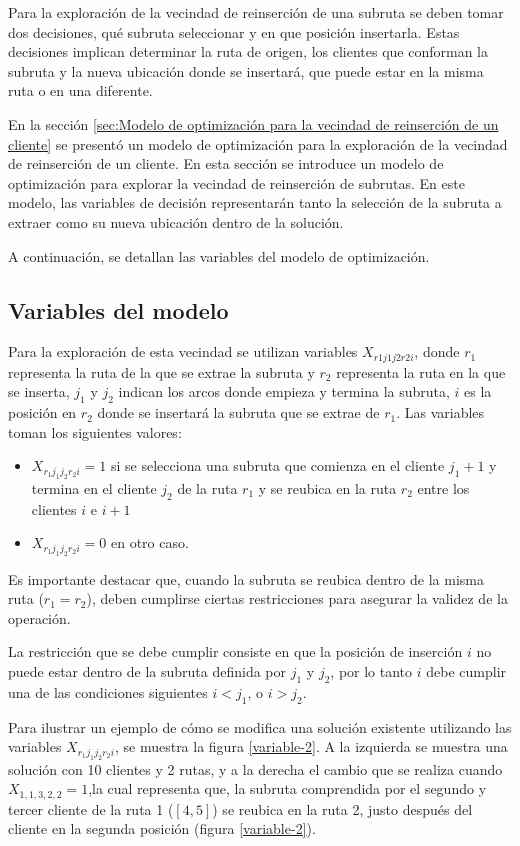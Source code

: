 \documentclass[12pt]{report}
\begin{document}
	Para la exploración de la vecindad de reinserción de una subruta se deben tomar dos decisiones, qué subruta seleccionar y en que posición insertarla. Estas decisiones implican determinar la ruta de origen, los clientes que conforman la subruta y la nueva ubicación donde se insertará, que puede estar en la misma ruta o en una diferente.

	En la sección \ref{sec:Modelo de optimización para la vecindad de reinserción de un cliente} se presentó un modelo de optimización para la exploración de la vecindad de reinserción de un cliente. En esta sección se introduce un modelo de optimización para explorar la vecindad de reinserción de subrutas. En este modelo, las variables de decisión representarán tanto la selección de la subruta a extraer como su nueva ubicación dentro de la solución.

	A continuación, se detallan las variables del modelo de optimización.

	\subsection{Variables del modelo}

	Para la exploración de esta vecindad se utilizan variables $X_{r1j1j2r2i}$, donde $r_1$ representa la ruta de la que se extrae la subruta y $r_2$ representa la ruta en la que se inserta, $j_1$ y $j_2$ indican los arcos donde empieza y termina la subruta, $i$ es la posición en $r_2$ donde se insertará la subruta que se extrae de $r_1$. Las variables toman los siguientes valores:
	\begin{itemize}
		\item $X_{r_1 j_1 j_2 r_2 i} = 1$ si se selecciona una subruta que comienza en el cliente $j_1 +1$ y termina en el cliente $j_2$ de la ruta $r_1$ y se reubica en la ruta $r_2$ entre los clientes $i$ e $i+1$
		\item $X_{r_1 j_1 j_2 r_2 i} = 0$ en otro caso.
	\end{itemize}

	Es importante destacar que, cuando la subruta se reubica dentro de la misma ruta ($r_1=r_2$), deben cumplirse ciertas restricciones para asegurar la validez de la operación.

    La restricción que se debe cumplir consiste en que la posición de inserción $i$ no puede estar dentro de la subruta definida por $j_1$ y $j_2$, por lo tanto $i$ debe cumplir una de las condiciones siguientes $i < j_1$, o $i>j_2$.


	Para ilustrar un ejemplo de cómo se modifica una solución existente utilizando las variables $X_{r_1j_1j_2r_2i}$, se muestra la figura \ref{variable-2}. A la izquierda se muestra una solución con 10 clientes y 2 rutas, y a la derecha el cambio que se realiza cuando $X_{1,1,3,2,2}=1$,la cual representa que, la subruta comprendida por el segundo y tercer cliente de la ruta 1 (\([4,5]\)) se reubica en la ruta 2, justo después del cliente en la segunda posición (figura \ref{variable-2}).
\end{document}

